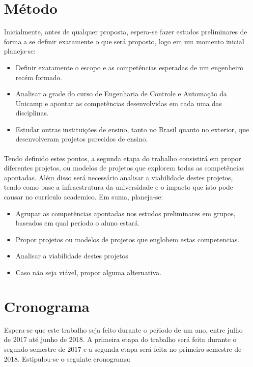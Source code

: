 \documentclass[12pt]{article} %
\begin{document}
\section{Método}

Inicialmente, antes de qualquer proposta, espera-se fazer estudos preliminares de forma a se definir exatamente o que será proposto, logo em um momento inicial planeja-se:

\begin{itemize}
\item Definir exatamente o escopo e as competências esperadas de um engenheiro recém formado.
\item Analisar a grade do curso de Engenharia de Controle e Automação da Unicamp e apontar as competências desenvolvidas em cada uma das disciplinas.
\item Estudar outras instituições de ensino, tanto no Brasil quanto no exterior, que desenvolveram projetos parecidos de ensino.
\end{itemize}

\paragraph{} Tendo definido estes pontos, a segunda etapa do trabalho consistirá em propor diferentes projetos, ou modelos de projetos que explorem todas as competências apontadas. Além disso será necessário analisar a viabilidade destes projetos, tendo como base a infraestrutura da universidade e o impacto que isto pode causar no currículo academico. Em suma, planeja-se:

\begin{itemize}
\item Agrupar as competências apontadas nos estudos preliminares em grupos, baseados em qual período o aluno estará.
\item Propor projetos ou modelos de projetos que englobem estas competencias.
\item Analisar a viabilidade destes projetos
\item Caso não seja viável, propor alguma alternativa.
\end{itemize}

\section{Cronograma}

Espera-se que este trabalho seja feito durante o peŕiodo de um ano, entre julho de 2017 até junho de 2018. A primeira etapa do trabalho será feita durante o segundo semestre de 2017 e a segunda etapa será feita no primeiro semestre de 2018. Estipulou-se o seguinte cronograma:
\end{document}
